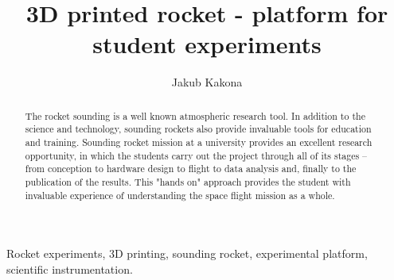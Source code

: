 \documentclass{poster16}
\begin{document}

%
\title{3D printed rocket - platform for student experiments}
%

%
\author{Jakub Kakona }
%


\maketitle


\begin{abstract}
The rocket sounding is a well known atmospheric research tool. In addition to the science and technology, sounding rockets also provide invaluable tools for education and training. Sounding rocket mission at a university provides an excellent research opportunity, in which the students carry out the project through all of its stages  --  from conception to hardware design to flight to data analysis and, finally to the publication of the results.  This "hands on" approach provides the student with invaluable experience of understanding the space flight mission as a whole.
\end{abstract}

\begin{keywords}
Rocket experiments, 3D printing, sounding rocket, experimental platform, scientific instrumentation.
\end{keywords}

\end{document}
